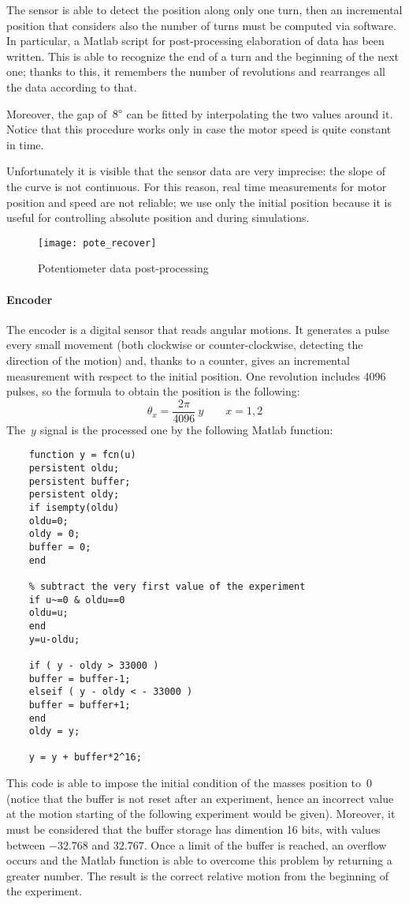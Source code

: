 The sensor is able to detect the position along only one turn, then an incremental position that considers also the number of turns must be computed via software.
In particular, a Matlab script for post-processing elaboration of data has been written. This is able to recognize the end of a turn and the beginning of the next one; thanks to this, it remembers the number of revolutions and rearranges all the data according to that.

Moreover, the gap of~$8 \degree$ can be fitted by interpolating the two values around it. Notice that this procedure works only in case the motor speed is quite constant in time.

Unfortunately it is visible that the sensor data are very imprecise: the slope of the curve is not continuous. For this reason, real time measurements for motor position and speed are not reliable; we use only the initial position because it is useful for controlling absolute position and  during simulations.
\begin{figure*}
	\centering
	\texttt{[image: pote\_recover]}
	\caption{Potentiometer data post-processing}
\end{figure*}

\paragraph{Encoder}

The encoder is a digital sensor that reads angular motions. It generates a pulse every small movement (both clockwise or counter-clockwise, detecting the direction of the motion) and, thanks to a counter, gives an incremental measurement with respect to the initial position. One revolution includes 4096 pulses, so the formula to obtain the position is the following:
\[
	\theta_x = \frac{2\pi}{4096} \ y \qquad x={1,2}
\]
The~$y$ signal is the processed one by the following Matlab function:
\begin{verbatim}
	function y = fcn(u)
	persistent oldu;
	persistent buffer;
	persistent oldy;
	if isempty(oldu)
	oldu=0;
	oldy = 0;
	buffer = 0;
	end
	
	% subtract the very first value of the experiment
	if u~=0 & oldu==0 
	oldu=u;
	end
	y=u-oldu;
	
	if ( y - oldy > 33000 )
	buffer = buffer-1;
	elseif ( y - oldy < - 33000 )
	buffer = buffer+1;
	end
	oldy = y;
	
	y = y + buffer*2^16;
\end{verbatim}
This code is able to impose the initial condition of the masses position to~$0$ (notice that the buffer is not reset after an experiment, hence an incorrect value at the motion starting of the following experiment would be given). Moreover, it must be considered that the buffer storage has dimention 16 bits, with values between $-32.768$ and $32.767$. Once a limit of the buffer is reached, an overflow occurs and the Matlab function is able to overcome this problem by returning a greater number. The result is the correct relative motion from the beginning of the experiment.

